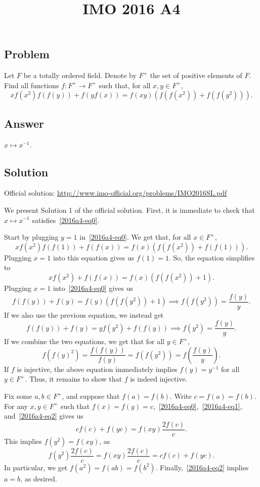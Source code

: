 \documentclass{article}
\title{IMO 2016 A4}
\author{}
\date{}
\begin{document}
\maketitle



\subsection*{Problem}

Let $F$ be a totally ordered field.
Denote by $F^+$ the set of positive elements of $F$.
Find all functions $f : F^+ \to F^+$ such that, for all $x, y \in F^+$,
\[ x f(x^2) f(f(y)) + f(y f(x)) = f(xy) (f(f(x^2)) + f(f(y^2))). \tag{*}\label{2016a4-eq0} \]



\subsection*{Answer}

$x \mapsto x^{-1}$.



\subsection*{Solution}

Official solution: \url{http://www.imo-official.org/problems/IMO2016SL.pdf}

We present Solution 1 of the official solution.
First, it is immediate to check that $x \mapsto x^{-1}$ satisfies~\eqref{2016a4-eq0}.

Start by plugging $y = 1$ in~\eqref{2016a4-eq0}.
We get that, for all $x \in F^+$,
\[ x f(x^2) f(f(1)) + f(f(x)) = f(x) (f(f(x^2)) + f(f(1))). \]
Plugging $x = 1$ into this equation gives us $f(1) = 1$.
So, the equation simplifies to
\[ x f(x^2) + f(f(x)) = f(x) (f(f(x^2)) + 1). \]
Plugging $x = 1$ into~\eqref{2016a4-eq0} gives us
\[ f(f(y)) + f(y) = f(y) (f(f(y^2)) + 1) \implies f(f(y^2)) = \frac{f(y)}{y}. \tag{1}\label{2016a4-eq1} \]
If we also use the previous equation, we instead get
\[ f(f(y)) + f(y) = y f(y^2) + f(f(y)) \implies f(y^2) = \frac{f(y)}{y}. \tag{2}\label{2016a4-eq2} \]
If we combine the two equations, we get that for all $y \in F^+$,
\[ f(f(y)^2) = \frac{f(f(y))}{f(y)} = f(f(y^2)) = f\left(\frac{f(y)}{y}\right). \]
If $f$ is injective, the above equation immediately implies $f(y) = y^{-1}$ for all $y \in F^+$.
Thus, it remains to show that $f$ is indeed injective.

Fix some $a, b \in F^+$, and suppose that $f(a) = f(b)$.
Write $c = f(a) = f(b)$.
For any $x, y \in F^+$ such that $f(x) = f(y) = c$,~\eqref{2016a4-eq0},~\eqref{2016a4-eq1}, and~\eqref{2016a4-eq2} gives us
\[ c f(c) + f(yc) = f(xy) \frac{2 f(c)}{c}. \]
This implies $f(y^2) = f(xy)$, as
\[ f(y^2) \frac{2 f(c)}{c} = f(xy) \frac{2 f(c)}{c} = c f(c) + f(yc). \]
In particular, we get $f(a^2) = f(ab) = f(b^2)$.
Finally,~\eqref{2016a4-eq2} implies $a = b$, as desired.
\end{document}
